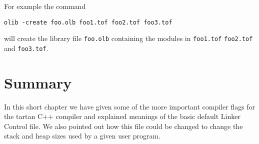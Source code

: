 For example the command
\begin{verbatim}
olib -create foo.olb foo1.tof foo2.tof foo3.tof
\end{verbatim}
will create the library file {\tt foo.olb} containing the modules
in {\tt foo1.tof} {\tt foo2.tof} and {\tt foo3.tof}.

\section{Summary}
In this short chapter we have given some of the more important compiler
flags for the tartan C++ compiler and explained meanings of the basic 
default Linker Control file. We also pointed out how this file could
be changed to change the stack and heap sizes used by a given user program.
